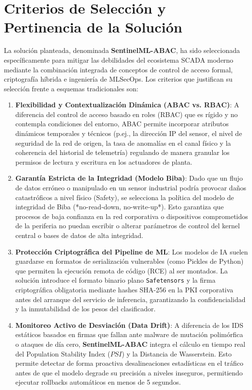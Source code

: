 \documentclass[12pt,letterpaper]{article}
\begin{document}
\section{Criterios de Selección y Pertinencia de la Solución}

La solución planteada, denominada \textbf{SentinelML-ABAC}, ha sido seleccionada específicamente para mitigar las debilidades del ecosistema SCADA moderno mediante la combinación integrada de conceptos de control de acceso formal, criptografía híbrida e ingeniería de MLSecOps. Los criterios que justifican su selección frente a esquemas tradicionales son:

\begin{enumerate}
    \item \textbf{Flexibilidad y Contextualización Dinámica (ABAC vs. RBAC)}: A diferencia del control de acceso basado en roles (RBAC) que es rígido y no contempla condiciones del entorno, ABAC permite incorporar atributos dinámicos temporales y técnicos (p.ej., la dirección IP del sensor, el nivel de seguridad de la red de origen, la tasa de anomalías en el canal físico y la coherencia del historial de telemetría) regulando de manera granular los permisos de lectura y escritura en los actuadores de planta.
    \item \textbf{Garantía Estricta de la Integridad (Modelo Biba)}: Dado que un flujo de datos erróneo o manipulado en un sensor industrial podría provocar daños catastróficos a nivel físico (Safety), se selecciona la política del modelo de integridad de Biba (*no-read-down, no-write-up*). Esto garantiza que procesos de baja confianza en la red corporativa o dispositivos comprometidos de la periferia no puedan escribir o alterar parámetros de control del kernel central o bases de datos de alta integridad.
    \item \textbf{Protección Criptográfica del Pipeline de ML}: Los modelos de IA suelen guardarse en formatos de serialización vulnerables (como Pickles de Python) que permiten la ejecución remota de código (RCE) al ser montados. La solución introduce el formato binario plano \texttt{Safetensors} y la firma criptográfica obligatoria mediante hashes SHA-256 en la PKI corporativa antes del arranque del servicio de inferencia, garantizando la confidencialidad y la inmutabilidad de los pesos del clasificador.
    \item \textbf{Monitoreo Activo de Desviación (Data Drift)}: A diferencia de los IDS estáticos basados en firmas que fallan ante malware de mutación polimórfica o ataques de día cero, \textbf{SentinelML-ABAC} integra el cálculo en tiempo real del Population Stability Index ($PSI$) y la Distancia de Wasserstein. Esto permite detectar de forma proactiva desalineaciones estadísticas en el tráfico antes de que el modelo degrade su precisión a niveles inseguros, permitiendo ejecutar rollbacks automáticos en menos de 5 segundos.
\end{enumerate}
\end{document}
